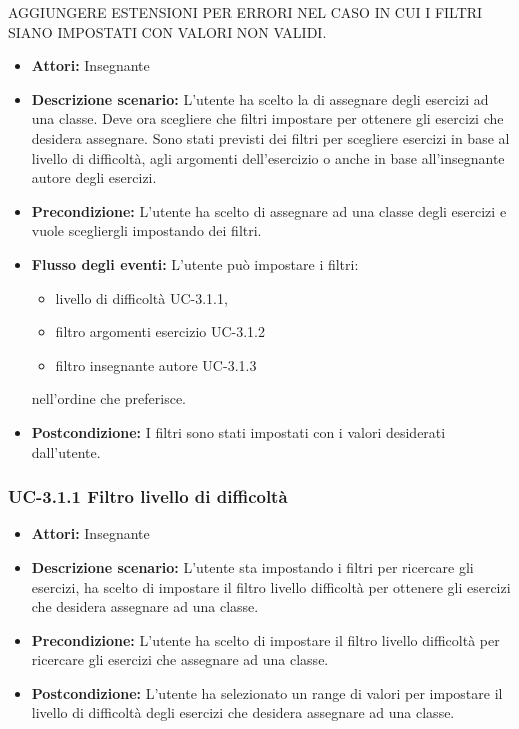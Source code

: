 AGGIUNGERE ESTENSIONI PER ERRORI NEL CASO IN CUI I FILTRI SIANO IMPOSTATI CON VALORI NON VALIDI.
\begin{itemize}
		\item \textbf{Attori: } Insegnante
		\item \textbf{Descrizione scenario: }L'utente ha scelto la di assegnare degli esercizi ad una classe. Deve ora scegliere che filtri impostare per ottenere gli esercizi che desidera assegnare. Sono stati previsti dei filtri per scegliere esercizi in base al livello di difficoltà, agli argomenti dell'esercizio o anche in base all'insegnante autore degli esercizi.
		\item \textbf{Precondizione: }L'utente ha scelto di assegnare ad una classe degli esercizi e vuole scegliergli impostando dei filtri.
		\item \textbf{Flusso degli eventi: }L'utente può impostare i filtri:
		\begin{itemize}
		\item livello di difficoltà UC-3.1.1, 
		\item filtro argomenti esercizio UC-3.1.2
		\item filtro insegnante autore UC-3.1.3
		\end{itemize}	
		nell'ordine che preferisce.	
		\item \textbf{Postcondizione: }I filtri sono stati impostati con i valori desiderati dall'utente.
\end{itemize}
\subsubsection{UC-3.1.1 Filtro livello di difficoltà}
\begin{itemize}
		\item \textbf{Attori: } Insegnante
		\item \textbf{Descrizione scenario: }L'utente sta impostando i filtri per ricercare gli esercizi, ha scelto di impostare il filtro livello difficoltà per ottenere gli esercizi che desidera assegnare ad una classe.
		\item \textbf{Precondizione: }L'utente ha scelto di impostare il filtro livello difficoltà per ricercare gli esercizi che assegnare ad una classe.
		\item \textbf{Postcondizione: }L'utente ha selezionato un range di valori per impostare il livello di difficoltà degli esercizi che desidera assegnare ad una classe.
\end{itemize}
